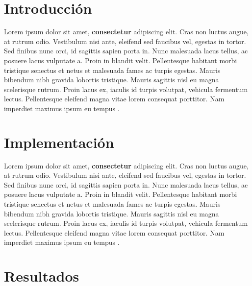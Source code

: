 \newpage %

\tableofcontents %


\newpage


\section{Introducción}

Lorem ipsum dolor sit amet, \textbf{consectetur} adipiscing elit. Cras non luctus augue, at rutrum odio. Vestibulum nisi ante, eleifend sed faucibus vel, egestas in tortor. Sed finibus nunc orci, id sagittis sapien porta in. Nunc malesuada lacus tellus, ac posuere lacus vulputate a. Proin in blandit velit. Pellentesque habitant morbi tristique senectus et netus et malesuada fames ac turpis egestas. Mauris bibendum nibh gravida lobortis tristique. Mauris sagittis nisl eu magna scelerisque rutrum. Proin lacus ex, iaculis id turpis volutpat, vehicula fermentum lectus. Pellentesque eleifend magna vitae lorem consequat porttitor. Nam imperdiet maximus ipsum eu tempus \cite{backpropagation-au}.

\section{Implementación}

Lorem ipsum dolor sit amet, \textbf{consectetur} adipiscing elit. Cras non luctus augue, at rutrum odio. Vestibulum nisi ante, eleifend sed faucibus vel, egestas in tortor. Sed finibus nunc orci, id sagittis sapien porta in. Nunc malesuada lacus tellus, ac posuere lacus vulputate a. Proin in blandit velit. Pellentesque habitant morbi tristique senectus et netus et malesuada fames ac turpis egestas. Mauris bibendum nibh gravida lobortis tristique. Mauris sagittis nisl eu magna scelerisque rutrum. Proin lacus ex, iaculis id turpis volutpat, vehicula fermentum lectus. Pellentesque eleifend magna vitae lorem consequat porttitor. Nam imperdiet maximus ipsum eu tempus \cite{backpropagation-de}.

\section{Resultados}

